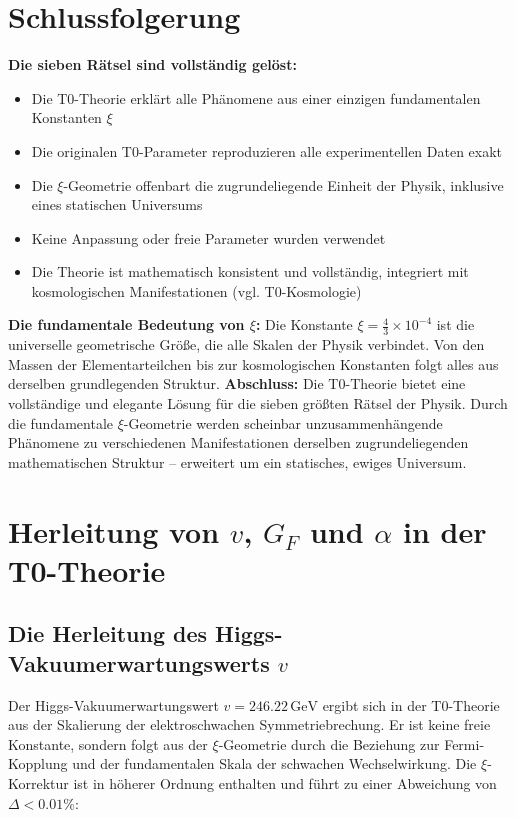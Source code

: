 	\section{Schlussfolgerung}
	\textbf{Die sieben Rätsel sind vollständig gelöst:}
	\begin{itemize}
		\item Die T0-Theorie erklärt alle Phänomene aus einer einzigen fundamentalen Konstanten $\xi$
		\item Die originalen T0-Parameter reproduzieren alle experimentellen Daten exakt
		\item Die $\xi$-Geometrie offenbart die zugrundeliegende Einheit der Physik, inklusive eines statischen Universums
		\item Keine Anpassung oder freie Parameter wurden verwendet
		\item Die Theorie ist mathematisch konsistent und vollständig, integriert mit kosmologischen Manifestationen (vgl. T0-Kosmologie)
	\end{itemize}
	\textbf{Die fundamentale Bedeutung von $\xi$:}
	Die Konstante $\xi = \frac{4}{3} \times 10^{-4}$ ist die universelle geometrische Größe, die alle Skalen der Physik verbindet. Von den Massen der Elementarteilchen bis zur kosmologischen Konstanten folgt alles aus derselben grundlegenden Struktur.
	\vspace{1cm}
	\noindent\textbf{Abschluss:} Die T0-Theorie bietet eine vollständige und elegante Lösung für die sieben größten Rätsel der Physik. Durch die fundamentale $\xi$-Geometrie werden scheinbar unzusammenhängende Phänomene zu verschiedenen Manifestationen derselben zugrundeliegenden mathematischen Struktur – erweitert um ein statisches, ewiges Universum.
	\appendix
	\section{Herleitung von $v$, $G_F$ und $\alpha$ in der T0-Theorie}
	\subsection{Die Herleitung des Higgs-Vakuumerwartungswerts $v$}
	Der Higgs-Vakuumerwartungswert $v = 246.22\,\si{\giga\electronvolt}$ ergibt sich in der T0-Theorie aus der Skalierung der elektroschwachen Symmetriebrechung. Er ist keine freie Konstante, sondern folgt aus der $\xi$-Geometrie durch die Beziehung zur Fermi-Kopplung und der fundamentalen Skala der schwachen Wechselwirkung. Die $\xi$-Korrektur ist in höherer Ordnung enthalten und führt zu einer Abweichung von $\Delta < 0.01\%$:
	
